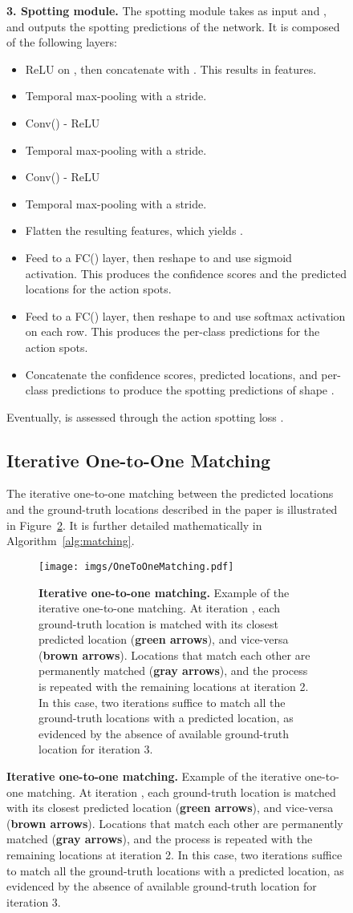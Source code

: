 \documentclass[10pt,twocolumn,letterpaper]{article}
\begin{document}
\begin{figure}[t]
{\begin{minipage}{\linewidth}
\textbf{\color{Green}3. Spotting module.} The spotting module takes as input  and , and outputs the spotting predictions  of the network. It is composed of the following layers:
\begin{itemize}
    \item ReLU on , then concatenate with . This results in  features.
    \item Temporal max-pooling  with a  stride.
    \item Conv() - ReLU
    \item Temporal max-pooling  with a  stride.
    \item Conv() - ReLU
    \item Temporal max-pooling  with a  stride.
    \item Flatten the resulting features, which yields .
    \item Feed  to a FC() layer, then reshape to  and use sigmoid activation. This produces the confidence scores and the predicted locations for the action spots.
    \item Feed  to a FC() layer, then reshape to  and use softmax activation on each row. This produces the per-class predictions for the action spots.
    \item Concatenate the confidence scores, predicted locations, and per-class predictions to produce the spotting predictions  of shape .
\end{itemize}
Eventually,  is assessed through the action spotting loss .





\subsection{Iterative One-to-One Matching}

The iterative one-to-one matching between the predicted locations  and the ground-truth locations  described in the paper is illustrated in Figure~\ref{fig:onetoonematching}. It is further detailed mathematically in Algorithm~\ref{alg:matching}.

\begin{figure}
    \centering
    \texttt{[image: imgs/OneToOneMatching.pdf]}\\
    \caption{\textbf{Iterative one-to-one matching.} Example of the iterative one-to-one matching. At iteration , each ground-truth location is matched with its closest predicted location (\textbf{{\color{anthogreen}green arrows}}), and vice-versa (\textbf{{\color{anthobrown}brown arrows}}). Locations that match each other are permanently matched (\textbf{\color{gray}gray arrows}), and the process is repeated with the remaining locations at iteration 2. In this case, two iterations suffice to match all the ground-truth locations with a predicted location, as evidenced by the absence of available ground-truth location for iteration 3. 
    }
    \label{fig:onetoonematching}
\end{figure}



\end{minipage}}
\end{figure}
\end{document}
